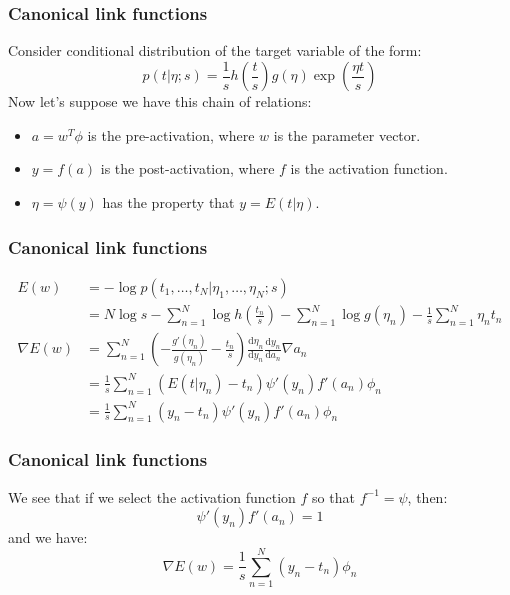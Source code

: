 \documentclass{beamer}
\begin{document}
\begin{frame}
    \frametitle{Canonical link functions}
    Consider conditional distribution of the target variable of the form:
    \begin{equation*}
        p(t|\eta;s)=\frac{1}{s}h(\frac{t}{s})g(\eta)\exp(\frac{\eta{}t}{s})
    \end{equation*}
    Now let's suppose we have this chain of relations:
    \begin{itemize}
        \item $a=w^{T}\phi$ is the pre-activation, where $w$ is the parameter vector.
        \item $y=f(a)$ is the post-activation, where $f$ is the activation function.
        \item $\eta=\psi(y)$ has the property that $y=E(t|\eta)$.
    \end{itemize}
\end{frame}

\begin{frame}
    \frametitle{Canonical link functions}
    \begin{align*}
        E(w)&=-\log{}p(t_{1},\hdots,t_{N}|\eta_{1},\hdots,\eta_{N};s) \\
        &=N\log{}s-\sum_{n=1}^{N}\log{}h(\frac{t_{n}}{s})-\sum_{n=1}^{N}\log{}g(\eta_{n})-\frac{1}{s}\sum_{n=1}^{N}\eta_{n}t_{n} \\
        \nabla{}E(w)&=\sum_{n=1}^{N}(-\frac{g'(\eta_{n})}{g(\eta_{n})}-\frac{t_{n}}{s})\frac{\mathrm{d}\eta_{n}}{\mathrm{d}y_{n}}\frac{\mathrm{d}y_{n}}{\mathrm{d}a_{n}}\nabla{}a_{n} \\
        &=\frac{1}{s}\sum_{n=1}^{N}(E(t|\eta_{n})-t_{n})\psi'(y_{n})f'(a_{n})\phi_{n} \\
        &=\frac{1}{s}\sum_{n=1}^{N}(y_{n}-t_{n})\psi'(y_{n})f'(a_{n})\phi_{n}
    \end{align*}
\end{frame}

\begin{frame}
    \frametitle{Canonical link functions}
    We see that if we select the activation function $f$ so that $f^{-1}=\psi$, then:
    \begin{equation*}
        \psi'(y_{n})f'(a_{n})=1
    \end{equation*}
    and we have:
    \begin{equation*}
        \nabla{}E(w)=\frac{1}{s}\sum_{n=1}^{N}(y_{n}-t_{n})\phi_{n}
    \end{equation*}
\end{frame}
\end{document}

